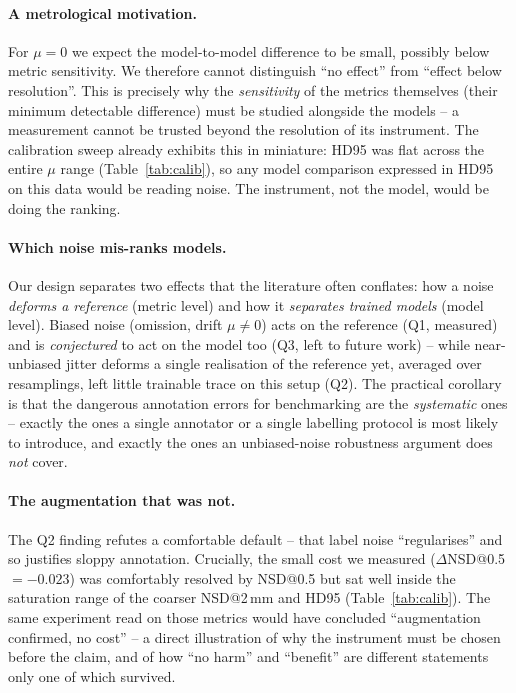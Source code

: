 \documentclass[
    bookmarks, bookmarksnumbered, bookmarksopen,
    colorlinks=true, citecolor=blue, linkcolor=blue, urlcolor=blue
]{techrep}
\begin{document}
\paragraph{A metrological motivation.} For $\mu{=}0$ we expect the model-to-model
difference to be small, possibly below metric sensitivity. We therefore cannot
distinguish ``no effect'' from ``effect below resolution''. This is precisely why the
\emph{sensitivity} of the metrics themselves (their minimum detectable difference) must
be studied alongside the models -- a measurement cannot be trusted beyond the
resolution of its instrument. The calibration sweep already exhibits this in miniature:
HD95 was flat across the entire $\mu$ range (Table~\ref{tab:calib}), so any model
comparison expressed in HD95 on this data would be reading noise. The instrument, not the
model, would be doing the ranking.

\paragraph{Which noise mis-ranks models.} Our design separates two effects that the
literature often conflates: how a noise \emph{deforms a reference} (metric level) and how
it \emph{separates trained models} (model level). Biased noise (omission, drift
$\mu\!\neq\!0$) acts on the reference (Q1, measured) and is \emph{conjectured} to act on the
model too (Q3, left to future work) -- while near-unbiased jitter deforms a single realisation of
the reference yet, averaged over resamplings, left little trainable trace on this setup (Q2). The practical corollary is
that the dangerous annotation errors for benchmarking are the \emph{systematic} ones --
exactly the ones a single annotator or a single labelling protocol is most likely to
introduce, and exactly the ones an unbiased-noise robustness argument does \emph{not}
cover.

\paragraph{The augmentation that was not.} The Q2 finding refutes a comfortable default -- that
label noise ``regularises'' and so justifies sloppy annotation. Crucially, the small cost we
measured ($\Delta$NSD@0.5${=}{-}0.023$) was comfortably resolved by NSD@0.5 but sat well inside
the saturation range of the coarser NSD@2\,mm and HD95 (Table~\ref{tab:calib}). The same
experiment read on those metrics would have concluded ``augmentation confirmed, no cost'' -- a
direct illustration of why the instrument must be chosen before the claim, and of how ``no
harm'' and ``benefit'' are different statements only one of which survived.
\end{document}

